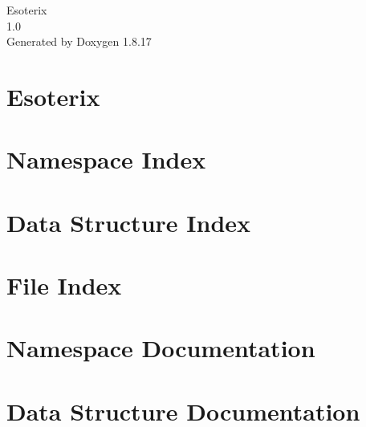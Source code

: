 \let\mypdfximage\pdfximage\def\pdfximage{\immediate\mypdfximage}\documentclass[twoside]{book}
\newcommand{\+}{\discretionary{\mbox{\scriptsize$\hookleftarrow$}}{}{}}
\newcommand{\clearemptydoublepage}{%
  \newpage{\pagestyle{empty}\cleardoublepage}%
}
\begin{document}
\hypersetup{pageanchor=false,
             bookmarksnumbered=true,
             pdfencoding=unicode
            }
\begin{titlepage}
\vspace*{7cm}
\begin{center}%
{\Large Esoterix \\[1ex]\large 1.\+0 }\\
\vspace*{1cm}
{\large Generated by Doxygen 1.8.17}\\
\end{center}
\end{titlepage}
\clearemptydoublepage
{}
\tableofcontents
\clearemptydoublepage
{}
\hypersetup{pageanchor=true}

\chapter{Esoterix}
\label{md__r_e_a_d_m_e}

\chapter{Namespace Index}

\chapter{Data Structure Index}

\chapter{File Index}

\chapter{Namespace Documentation}


\chapter{Data Structure Documentation}




\end{document}

